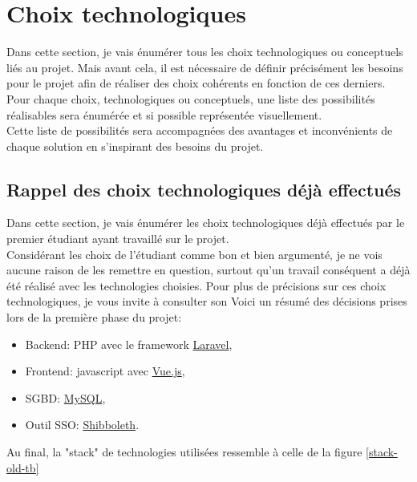 \documentclass[
    iai, %
    il, %
]{heig-tb}
\begin{document}
\section{Choix technologiques}

Dans cette section, je vais énumérer tous les choix technologiques ou conceptuels liés au projet.
Mais avant cela, il est nécessaire de définir précisément les besoins pour le projet afin de réaliser des choix cohérents en fonction de ces derniers.\\
Pour chaque choix, technologiques ou conceptuels, une liste des possibilités réalisables sera énumérée et si possible représentée visuellement.\\
Cette liste de possibilités sera accompagnées des avantages et inconvénients de chaque solution en s'inspirant des besoins du projet.

\subsection{Rappel des choix technologiques déjà effectués}
Dans cette section, je vais énumérer les choix technologiques déjà effectués par le premier étudiant ayant travaillé sur le projet.\\
Considérant les choix de l'étudiant comme bon et bien argumenté, je ne vois aucune raison de les remettre en question, surtout qu'un travail conséquent a déjà été réalisé avec les technologies choisies. Pour plus de précisions sur ces choix technologiques, je vous invite à consulter son %
Voici un résumé des décisions prises lors de la première phase du projet:
\begin{itemize}
    \item Backend: PHP avec le framework \href{https://laravel.com/}{Laravel},
    \item Frontend: \Gls{javascript} avec \href{https://vuejs.org/}{Vue.js},
    \item SGBD: \href{https://www.mysql.com/}{MySQL},
    \item Outil SSO: \href{https://www.switch.ch/aai/about/shibboleth/}{Shibboleth}. %
\end{itemize}

Au final, la "stack" de technologies utilisées ressemble à celle de la figure \ref{stack-old-tb}
\end{document}
